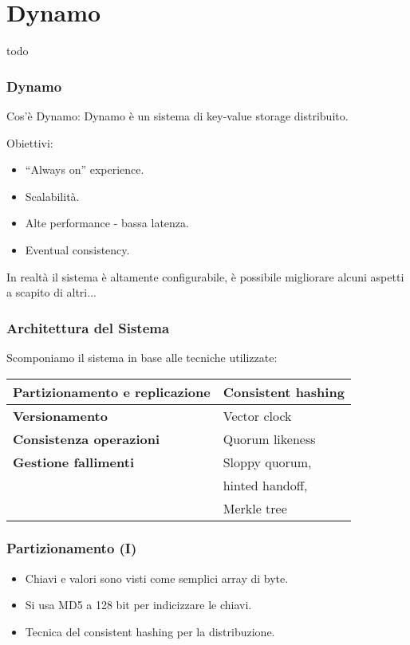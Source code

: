 \section{Dynamo}
\begin{frame}
  todo
\end{frame}


\begin{frame}
  \frametitle{Dynamo}
  \begin{block}{Cos'è Dynamo:}
  Dynamo è un sistema di key-value storage distribuito.
  \end{block}
  \begin{block}{Obiettivi:}      
      \begin{itemize}
      \item ``Always on'' experience.
      \item Scalabilità.
      \item Alte performance - bassa latenza.
      \item Eventual consistency.
      \end{itemize}
  \end{block}
  In realtà il sistema è altamente configurabile, è possibile migliorare alcuni aspetti a scapito di altri...
\end{frame}


\begin{frame}
  \frametitle{Architettura del Sistema}
  Scomponiamo il sistema in base alle tecniche utilizzate:
  \begin{center}
  \begin{tabular}{l | l}
    \textbf{Partizionamento e replicazione} & Consistent hashing \\
    \hline
    \textbf{Versionamento}                  & Vector clock \\
    \hline
    \textbf{Consistenza operazioni}         & Quorum likeness \\
    \hline
    \textbf{Gestione fallimenti}            & Sloppy quorum, \\
                                            & hinted handoff, \\
                                            & Merkle tree 
  \end{tabular}
  \end{center}
\end{frame}


\begin{frame}
  \frametitle{Partizionamento (I)}
  \begin{itemize}
  \item Chiavi e valori sono visti come semplici array di byte.
  \item Si usa MD5 a 128 bit per indicizzare le chiavi.
  \item Tecnica del \alert{consistent hashing} per la distribuzione.
  \end{itemize}
  
\end{frame}


